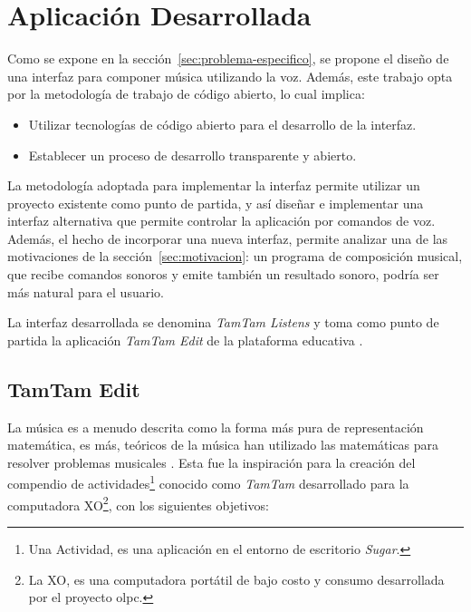 
\section{Aplicaci\'on Desarrollada}
\label{sec:aplicacion-desarrollada}

Como se expone en la secci\'on~\ref{sec:problema-especifico}, se propone el dise\~no
de una interfaz para componer m\'usica utilizando la voz. Adem\'as, este trabajo 
opta por la metodolog\'ia de trabajo de c\'odigo abierto, lo cual implica: 

\begin{itemize}
    \item Utilizar tecnolog\'ias de c\'odigo abierto para el desarrollo de la interfaz.
    \item Establecer un proceso de desarrollo transparente y abierto.
\end{itemize}

La metodolog\'ia adoptada para implementar la interfaz permite utilizar un proyecto
existente como punto de partida, y as\'i dise\~nar e implementar una interfaz alternativa que permite
controlar la aplicaci\'on por comandos de voz. Adem\'as,
el hecho de incorporar una nueva interfaz, permite analizar
una de las motivaciones de la secci\'on~\ref{sec:motivacion}: un programa de composici\'on
musical, que recibe comandos sonoros y emite tambi\'en un resultado sonoro, podr\'ia ser
m\'as natural para el usuario. 

La interfaz desarrollada se denomina \emph{TamTam Listens} y toma como punto de partida la 
aplicaci\'on \emph{TamTam Edit} de la plataforma educativa .

\subsection{TamTam Edit}
\label{sec:tamtam-edit}

La m\'usica es a menudo descrita como la forma m\'as pura de representaci\'on matem\'atica, es m\'as,
te\'oricos de la m\'usica han utilizado las matem\'aticas para resolver problemas musicales
\cite{TheSoundOfNumbers}. Esta fue la inspiraci\'on para la creaci\'on del compendio de 
actividades\footnote{Una Actividad, es una aplicaci\'on en el entorno de escritorio \emph{Sugar}.}
conocido como \emph{TamTam} desarrollado para la computadora XO\footnote{La XO, es una computadora 
port\'atil de bajo costo y consumo desarrollada por el proyecto \gls{olpc}.},
con los siguientes objetivos:

